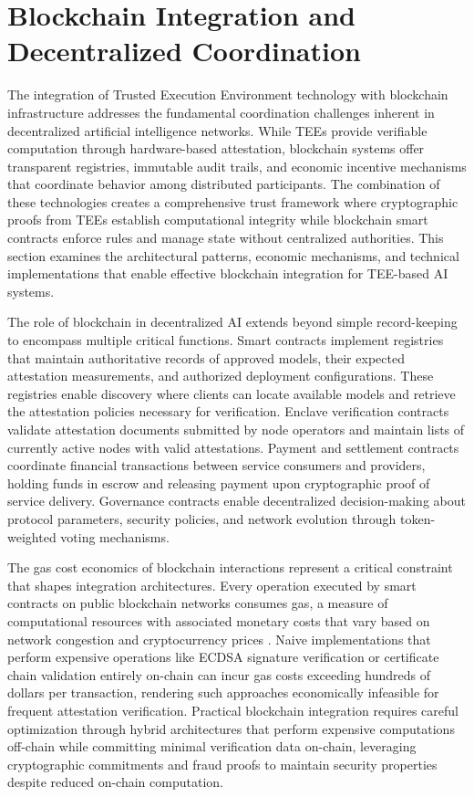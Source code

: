 \section{Blockchain Integration and Decentralized Coordination}

The integration of Trusted Execution Environment technology with blockchain infrastructure addresses the fundamental coordination challenges inherent in decentralized artificial intelligence networks. While TEEs provide verifiable computation through hardware-based attestation, blockchain systems offer transparent registries, immutable audit trails, and economic incentive mechanisms that coordinate behavior among distributed participants. The combination of these technologies creates a comprehensive trust framework where cryptographic proofs from TEEs establish computational integrity while blockchain smart contracts enforce rules and manage state without centralized authorities. This section examines the architectural patterns, economic mechanisms, and technical implementations that enable effective blockchain integration for TEE-based AI systems.

The role of blockchain in decentralized AI extends beyond simple record-keeping to encompass multiple critical functions. Smart contracts implement registries that maintain authoritative records of approved models, their expected attestation measurements, and authorized deployment configurations. These registries enable discovery where clients can locate available models and retrieve the attestation policies necessary for verification. Enclave verification contracts validate attestation documents submitted by node operators and maintain lists of currently active nodes with valid attestations. Payment and settlement contracts coordinate financial transactions between service consumers and providers, holding funds in escrow and releasing payment upon cryptographic proof of service delivery. Governance contracts enable decentralized decision-making about protocol parameters, security policies, and network evolution through token-weighted voting mechanisms.

The gas cost economics of blockchain interactions represent a critical constraint that shapes integration architectures. Every operation executed by smart contracts on public blockchain networks consumes gas, a measure of computational resources with associated monetary costs that vary based on network congestion and cryptocurrency prices \cite{gas_optimization}. Naive implementations that perform expensive operations like ECDSA signature verification or certificate chain validation entirely on-chain can incur gas costs exceeding hundreds of dollars per transaction, rendering such approaches economically infeasible for frequent attestation verification. Practical blockchain integration requires careful optimization through hybrid architectures that perform expensive computations off-chain while committing minimal verification data on-chain, leveraging cryptographic commitments and fraud proofs to maintain security properties despite reduced on-chain computation.

